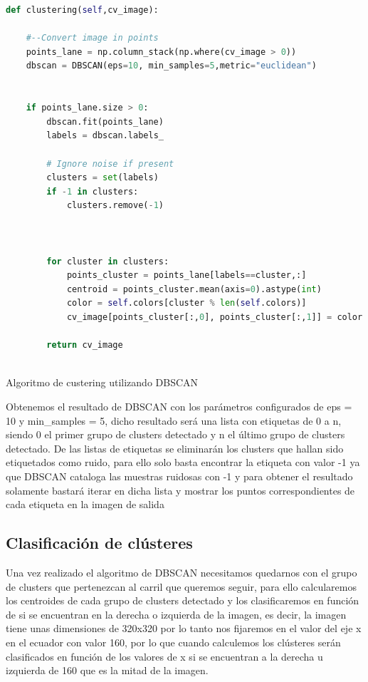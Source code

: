 \begin{code}[h]
  \begin{lstlisting}[language=Python]
    def clustering(self,cv_image):

    #--Convert image in points
    points_lane = np.column_stack(np.where(cv_image > 0))
    dbscan = DBSCAN(eps=10, min_samples=5,metric="euclidean")
    

    if points_lane.size > 0:
        dbscan.fit(points_lane)
        labels = dbscan.labels_

        # Ignore noise if present
        clusters = set(labels)
        if -1 in clusters:
            clusters.remove(-1)
      
      
            
        for cluster in clusters:
            points_cluster = points_lane[labels==cluster,:]
            centroid = points_cluster.mean(axis=0).astype(int)
            color = self.colors[cluster % len(self.colors)]
            cv_image[points_cluster[:,0], points_cluster[:,1]] = color

        return cv_image
  
  \end{lstlisting}
  \caption[Algoritmo de custering utilizando DBSCAN]{Algoritmo de custering utilizando DBSCAN}
  \label{cod:codejemplo}
  \end{code}  
  

Obtenemos el resultado de DBSCAN con los parámetros configurados de eps = 10 y min\_samples = 5, dicho resultado será una lista con etiquetas de 0 a n, siendo 0 el primer grupo de clusters detectado y 
n el último grupo de clusters detectado. De las listas de etiquetas se eliminarán los clusters que hallan sido etiquetados como ruido, para ello solo basta encontrar la etiqueta con valor -1 ya que
DBSCAN cataloga las muestras ruidosas con -1 y para obtener el resultado solamente bastará iterar en dicha lista y mostrar los puntos correspondientes de cada etiqueta en la imagen de salida

\subsection{Clasificación de clústeres}
\label{clasificación:cluster}
Una vez realizado el algoritmo de DBSCAN necesitamos quedarnos con el grupo de clusters que pertenezcan al carril que queremos seguir, para ello calcularemos los centroides de cada
grupo de clusters detectado y los clasificaremos en función de si se encuentran en la derecha o izquierda de la imagen, es decir, la imagen tiene unas dimensiones de 320x320 por lo tanto 
nos fijaremos en el valor del eje x en el ecuador con valor 160, por lo que cuando calculemos los clústeres serán clasificados en función de los valores de x si se encuentran a la derecha u izquierda de 160 
que es la mitad de la imagen. \newline

